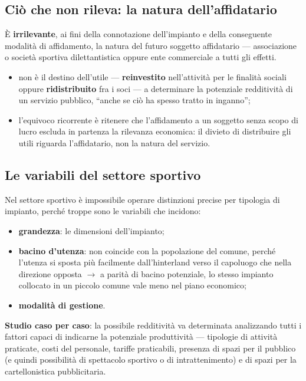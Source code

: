 \subsection{Ciò che non rileva: la natura dell'affidatario}

È \textbf{irrilevante}, ai fini della connotazione dell'impianto e della conseguente modalità di
affidamento, la natura del futuro soggetto affidatario --- associazione o società sportiva
dilettantistica oppure ente commerciale a tutti gli effetti.

\begin{itemize}
  \item non è il destino dell'utile --- \textbf{reinvestito} nell'attività per le finalità sociali
    oppure \textbf{ridistribuito} fra i soci --- a determinare la potenziale redditività di un
    servizio pubblico, ``anche se ciò ha spesso tratto in inganno'';
  \item l'equivoco ricorrente è ritenere che l'affidamento a un soggetto senza scopo di lucro
    escluda in partenza la rilevanza economica: il divieto di distribuire gli utili riguarda
    l'affidatario, non la natura del servizio.
\end{itemize}

\subsection{Le variabili del settore sportivo}

Nel settore sportivo è impossibile operare distinzioni precise per tipologia di impianto, perché
troppe sono le variabili che incidono:

\begin{itemize}
  \item \textbf{grandezza}: le dimensioni dell'impianto;
  \item \textbf{bacino d'utenza}: non coincide con la popolazione del comune, perché l'utenza si
    sposta più facilmente dall'hinterland verso il capoluogo che nella direzione opposta
    $\rightarrow$ a parità di bacino potenziale, lo stesso impianto collocato in un piccolo comune
    vale meno nel piano economico;
  \item \textbf{modalità di gestione}.
\end{itemize}

\textbf{Studio caso per caso}: la possibile redditività va determinata analizzando tutti i fattori
capaci di indicarne la potenziale produttività --- tipologie di attività praticate, costi del
personale, tariffe praticabili, presenza di spazi per il pubblico (e quindi possibilità di
spettacolo sportivo o di intrattenimento) e di spazi per la cartellonistica pubblicitaria.

